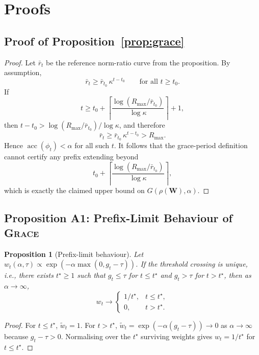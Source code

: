 \documentclass{article}
\newtheorem{proposition}[theorem]{Proposition}
\theoremstyle{remark}
\newcommand{\bW}{\mathbf{W}}
\newcommand{\grace}{\textnormal{\textsc{Grace}}}
\newcommand{\sr}{\rho(\bW)}
\begin{document}
\section{Proofs}
\label{app:proofs}

\subsection{Proof of Proposition~\ref{prop:grace}}

\begin{proof}
Let $\bar r_t$ be the reference norm-ratio curve from the proposition. By assumption,
\[
  \bar r_t \geq \bar r_{t_0}\,\kappa^{t-t_0}
  \qquad \text{for all } t \geq t_0.
\]
If
\[
  t \geq t_0 + \left\lceil
  \frac{\log(R_{\max}/\bar r_{t_0})}{\log\kappa}
  \right\rceil + 1,
\]
then
$t - t_0 > \log(R_{\max}/\bar r_{t_0})/\log\kappa$, and therefore
\[
  \bar r_t \geq \bar r_{t_0}\,\kappa^{t-t_0} > R_{\max}.
\]
Hence $\operatorname{acc}(\phi_t) < \alpha$ for all such $t$. It follows that
the grace-period definition cannot certify any prefix extending beyond
\[
  t_0 + \left\lceil
  \frac{\log(R_{\max}/\bar r_{t_0})}{\log\kappa}
  \right\rceil,
\]
which is exactly the claimed upper bound on $G(\sr,\alpha)$.
\end{proof}

\subsection{Proposition A1: Prefix-Limit Behaviour of \grace{}}
\label{app:prop:prefix}

\begin{proposition}[Prefix-limit behaviour]
\label{prop:prefix_limit}
Let $w_t(\alpha, \tau) \propto \exp(-\alpha\max(0, g_t - \tau))$. If
the threshold crossing is unique, i.e., there exists $t^\star\geq1$ such that
$g_t \leq \tau$ for $t \leq t^\star$ and $g_t > \tau$ for $t > t^\star$,
then as $\alpha \to \infty$,
\[
  w_t \to \begin{cases} 1 / t^\star, & t \leq t^\star, \\ 0, & t > t^\star. \end{cases}
\]
\end{proposition}

\begin{proof}
For $t \leq t^\star$, $\tilde{w}_t = 1$. For $t > t^\star$,
$\tilde{w}_t = \exp(-\alpha(g_t - \tau)) \to 0$ as $\alpha \to \infty$
because $g_t - \tau > 0$. Normalising over the $t^\star$ surviving
weights gives $w_t = 1/t^\star$ for $t \leq t^\star$.
\end{proof}
\end{document}
